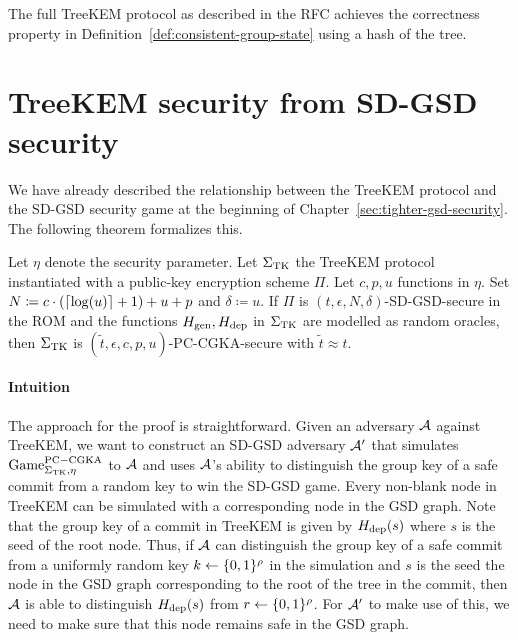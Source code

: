 The full TreeKEM protocol as described in the RFC achieves the correctness property in Definition~\ref{def:consistent-group-state} using a hash of the tree.

\section{TreeKEM security from SD-GSD security}

We have already described the relationship between the TreeKEM protocol and the SD-GSD security game at the beginning of Chapter~\ref{sec:tighter-gsd-security}. The following theorem formalizes this.

\begin{theorem}
	Let $\eta$ denote the security parameter.
	Let $\Sigma_{\mathrm{TK}}$ the TreeKEM protocol instantiated with a public-key encryption scheme $\Pi$. Let $c, p, u$ functions in $\eta$. Set $N \coloneqq c \cdot (\lceil\log(u)\rceil + 1) + u + p$ and $\delta \coloneqq u$. If $\Pi$ is $(t, \epsilon, N, \delta)$-SD-GSD-secure in the ROM and the functions $H_\mathrm{gen}, H_\mathrm{dep}$ in $\Sigma_{\mathrm{TK}}$ are modelled as random oracles, then $\Sigma_{\mathrm{TK}}$ is $(\tilde{t}, \epsilon, c, p, u)$-PC-CGKA-secure with $\tilde{t} \approx t$.
\end{theorem}

\paragraph{Intuition} The approach for the proof is straightforward. Given an adversary $\mathcal{A}$ against TreeKEM, we want to construct an SD-GSD adversary $\mathcal{A}'$ that simulates $\mathrm{Game}_{\Sigma_{\mathrm{TK}}, \eta}^{\mathrm{PC-CGKA}}$ to $\mathcal{A}$ and uses $\mathcal{A}$'s ability to distinguish the group key of a safe commit from a random key to win the SD-GSD game. Every non-blank node in TreeKEM can be simulated with a corresponding node in the GSD graph. Note that the group key of a commit in TreeKEM is given by $H_\mathrm{dep}(s)$ where $s$ is the seed of the root node. Thus, if $\mathcal{A}$ can distinguish the group key of a safe commit from a uniformly random key $k \leftarrow \{0, 1\}^\rho$ in the simulation and $s$ is the seed the node in the GSD graph corresponding to the root of the tree in the commit, then $\mathcal{A}$ is able to distinguish $H_\mathrm{dep}(s)$ from $r \leftarrow \{0, 1\}^\rho$. For $\mathcal{A}'$ to make use of this, we need to make sure that this node remains safe in the GSD graph.

